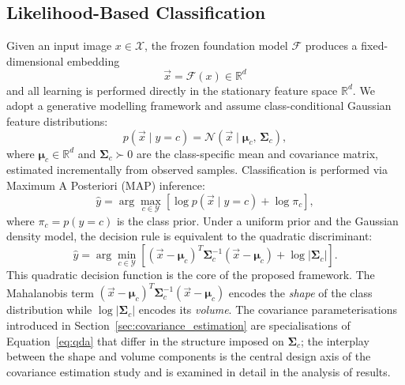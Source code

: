 \subsection{Likelihood-Based Classification}
\label{sec:method:classification}

Given an input image $x \in \mathcal{X}$, the frozen foundation model $\mathcal{F}$ produces a fixed-dimensional embedding
\begin{equation}
    \vec{x} = \mathcal{F}(x) \in \mathbb{R}^d
    \label{eq:feature_extractor}
\end{equation}
and all learning is performed directly in the stationary feature space $\mathbb{R}^d$. We adopt a generative modelling framework and assume class-conditional Gaussian feature distributions:
\begin{equation}
    p(\vec{x} \mid y = c) = \mathcal{N}(\vec{x} \mid \boldsymbol{\mu}_c,\, \boldsymbol{\Sigma}_c),
    \label{eq:class_gaussian}
\end{equation}
where $\boldsymbol{\mu}_c \in \mathbb{R}^d$ and $\boldsymbol{\Sigma}_c \succ 0$ are the class-specific mean and covariance matrix, estimated incrementally from observed samples. Classification is performed via Maximum A Posteriori (MAP) inference:
\begin{equation}
    \hat{y} = \arg\max_{c \in \mathcal{Y}} \left[ \log p(\vec{x} \mid y=c) + \log \pi_c \right],
    \label{eq:map}
\end{equation}
where $\pi_c = p(y=c)$ is the class prior. Under a uniform prior and the Gaussian density model, the decision rule is equivalent to the quadratic discriminant:
\begin{equation}
    \hat{y} = \arg\min_{c \in \mathcal{Y}} \left[ (\vec{x} - \boldsymbol{\mu}_c)^T \boldsymbol{\Sigma}_c^{-1} (\vec{x} - \boldsymbol{\mu}_c) + \log|\boldsymbol{\Sigma}_c| \right].
    \label{eq:qda}
\end{equation}
This quadratic decision function is the core of the proposed framework. The Mahalanobis term $(\vec{x}-\boldsymbol{\mu}_c)^T\boldsymbol{\Sigma}_c^{-1}(\vec{x}-\boldsymbol{\mu}_c)$ encodes the \emph{shape} of the class distribution while $\log|\boldsymbol{\Sigma}_c|$ encodes its \emph{volume}. The covariance parameterisations introduced in Section~\ref{sec:covariance_estimation} are specialisations of Equation~\eqref{eq:qda} that differ in the structure imposed on $\boldsymbol{\Sigma}_c$; the interplay between the shape and volume components is the central design axis of the covariance estimation study and is examined in detail in the analysis of results.

